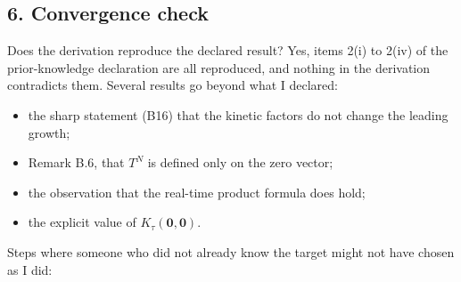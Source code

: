 \documentclass[11pt,a4paper]{article}
\providecommand{\tightlist}{\setlength{\itemsep}{0pt}\setlength{\parskip}{0pt}}
\begin{document}
\hypertarget{convergence-check}{%
\subsection{6. Convergence check}\label{convergence-check}}

Does the derivation reproduce the declared result? Yes, items 2(i) to 2(iv) of the prior-knowledge declaration are all reproduced, and nothing in the derivation contradicts them. Several results go beyond what I declared:

\begin{itemize}
\tightlist
\item
  the sharp statement (B16) that the kinetic factors do not change the leading growth;
\item
  Remark B.6, that \(T^N\) is defined only on the zero vector;
\item
  the observation that the real-time product formula does hold;
\item
  the explicit value of \(K_\tau(\mathbf 0,\mathbf 0)\).
\end{itemize}

Steps where someone who did not already know the target might not have chosen as I did:
\end{document}
